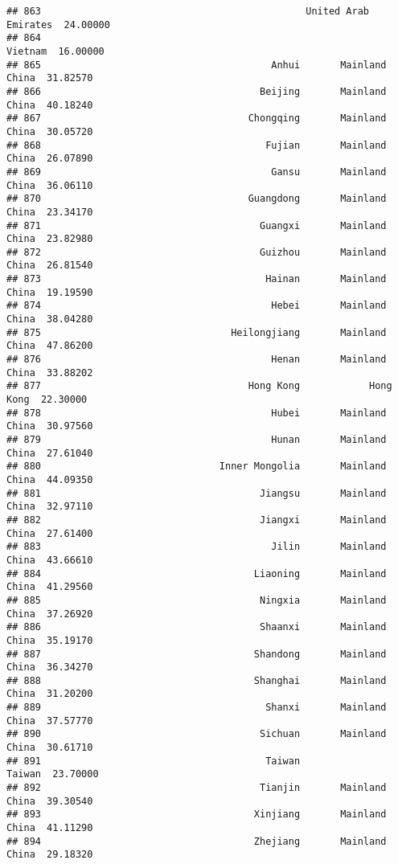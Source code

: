 \documentclass[
]{article}
\begin{document}
\begin{verbatim}
## 863                                              United Arab Emirates  24.00000
## 864                                                           Vietnam  16.00000
## 865                                        Anhui       Mainland China  31.82570
## 866                                      Beijing       Mainland China  40.18240
## 867                                    Chongqing       Mainland China  30.05720
## 868                                       Fujian       Mainland China  26.07890
## 869                                        Gansu       Mainland China  36.06110
## 870                                    Guangdong       Mainland China  23.34170
## 871                                      Guangxi       Mainland China  23.82980
## 872                                      Guizhou       Mainland China  26.81540
## 873                                       Hainan       Mainland China  19.19590
## 874                                        Hebei       Mainland China  38.04280
## 875                                 Heilongjiang       Mainland China  47.86200
## 876                                        Henan       Mainland China  33.88202
## 877                                    Hong Kong            Hong Kong  22.30000
## 878                                        Hubei       Mainland China  30.97560
## 879                                        Hunan       Mainland China  27.61040
## 880                               Inner Mongolia       Mainland China  44.09350
## 881                                      Jiangsu       Mainland China  32.97110
## 882                                      Jiangxi       Mainland China  27.61400
## 883                                        Jilin       Mainland China  43.66610
## 884                                     Liaoning       Mainland China  41.29560
## 885                                      Ningxia       Mainland China  37.26920
## 886                                      Shaanxi       Mainland China  35.19170
## 887                                     Shandong       Mainland China  36.34270
## 888                                     Shanghai       Mainland China  31.20200
## 889                                       Shanxi       Mainland China  37.57770
## 890                                      Sichuan       Mainland China  30.61710
## 891                                       Taiwan               Taiwan  23.70000
## 892                                      Tianjin       Mainland China  39.30540
## 893                                     Xinjiang       Mainland China  41.11290
## 894                                     Zhejiang       Mainland China  29.18320

\end{verbatim}
\end{document}
